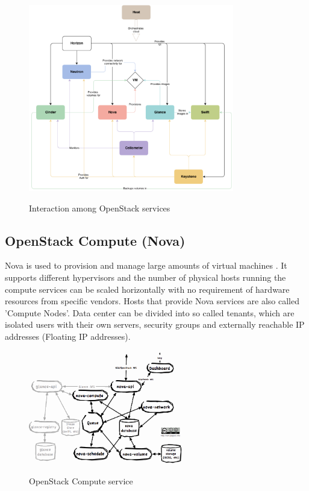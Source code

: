 \begin{figure}[H]
\centering
\includegraphics[width=0.8\textwidth]{images/fundamentals/openstack_conceptual_arch.png}
\caption{Interaction among OpenStack services}\cite{openstack-installjuno}
\end{figure}


\subsection{OpenStack Compute (Nova)}

Nova is used to provision and manage large amounts of virtual machines . It supports different hypervisors and the number of physical hosts running the compute services can be scaled horizontally with no requirement of hardware resources from specific vendors. Hosts that provide Nova services are also called 'Compute Nodes'. Data center can be divided into so called tenants, which are isolated users with their own servers, security groups and externally reachable IP addresses (Floating IP addresses). 

\begin{figure}[H]
\centering
\includegraphics[width=0.6\textwidth]{images/fundamentals/openstack_nova.png}
\caption{OpenStack Compute service} \cite{nova-arch}
\end{figure}

